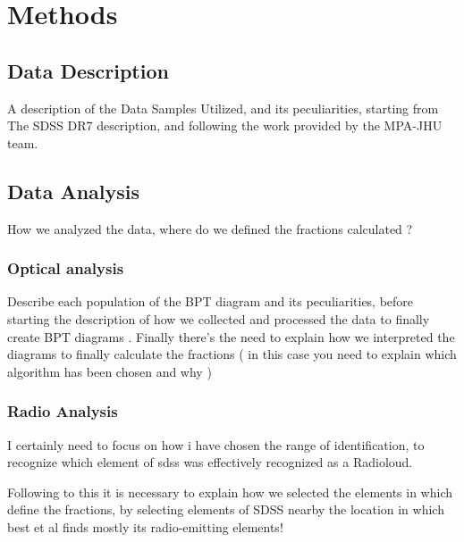 \chapter{Methods}

\section{Data Description}
A description of the Data Samples Utilized, and its peculiarities, starting from The SDSS DR7 description, and following the work provided by the MPA-JHU team.
\section{Data Analysis}
How we analyzed the data, where do we defined the fractions calculated ?
\subsection{Optical analysis}
Describe each population of the BPT diagram and its peculiarities, before starting the description of how we collected and processed the data to finally create BPT diagrams .
Finally there's the need to explain how we interpreted the diagrams to finally calculate the fractions ( in this case you need to explain which algorithm has been chosen and why ) 


\subsection{Radio Analysis}
I certainly need to focus on how i have chosen the range of identification, to recognize which element of sdss was effectively recognized as a Radioloud.

Following to this it is necessary to explain how we selected the elements in which define the fractions, by selecting elements of SDSS nearby the location in which best et al finds mostly its radio-emitting elements!